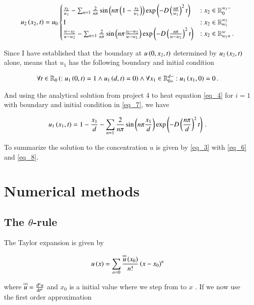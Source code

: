 \documentclass[11pt,english,a4paper]{article}
\begin{document}
\begin{flushleft}
\begin{align}
u_2\p{x_2,t} = u_0 \begin{cases} \frac{x_2}{w_1} - \sum_{n=1} \frac{2}{n \pi} \sin\p{n\pi\p{1-\frac{x_2}{w_1}}}\exp\p{-D\p{\frac{n\pi}{w_1}}^2 t} &: x_2\in\mathbb{R}_0^{w_1-}\\ 1 &: x_2 \in\mathbb{R}_{w_1}^{w_2} \\  \frac{w-x_2}{w-w_2} - \sum_{n=1} \frac{2}{n \pi} \sin\p{n\pi\frac{x_2-w_2}{w-w_2}}\exp\p{-D\p{\frac{n\pi}{w-w_2}}^2 t} & : x_2\in\mathbb{R}_{w_2+}^w \,.\end{cases}
\label{eq_6}
\end{align}

Since I have established that the boundary at $u\p{0,x_2,t}$ determined by $u_2\p{x_2,t}$ alone, means that $u_1$ has the following boundary and initial condition

\begin{align}
\forall t \in \mathbb{R}_0\p{: u_1\p{0,t} = 1 \wedge u_1\p{d,t} = 0} \wedge  \forall x_1 \in \mathbb{R}_{0+}^{d-} : u_1\p{x_1,0}=0 \,.  
\label{eq_7}
\end{align}

And using the analytical solution from project 4 to heat equation \eqref{eq_4} for $i=1$ with boundary and initial condition in \eqref{eq_7}, we have 

\begin{align}
u_1\p{x_1,t} = 1-\frac{x_1}{d} - \sum_{n=1} \frac{2}{n \pi} \sin\p{n\pi\frac{x_1}{d}}\exp\p{-D\p{\frac{n\pi}{d}}^2 t} \,.
\label{eq_8}
\end{align}

To summarize the solution to the concentration $u$ is given by \eqref{eq_3} with \eqref{eq_6} and \eqref{eq_8}. 


\section{Numerical methods}

\subsection{The $\theta$-rule}

The Taylor expansion is given by

\begin{align}
u\p{x} = \sum_{n=0} \frac{\T{u}{(n)}\p{x_0}}{n!}\p{x-x_0}^n
\label{eq_9}
\end{align}

where $\T{u}{(n)} = \frac{\mathrm{d}^n u}{\mathrm{d}t^n}$ and $x_0$ is a initial value where we step from to $x$ . If we now use the first order approximation


\end{flushleft}
\end{document}
